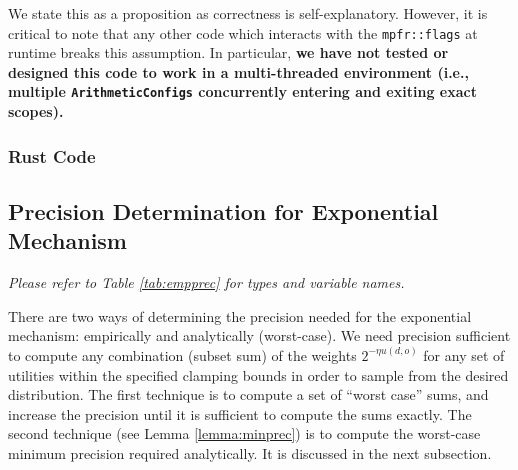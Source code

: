 \documentclass[11pt]{article}
\theoremstyle{definition}
\begin{document}
We state this as a proposition as correctness is self-explanatory. However, it is critical to note that any other code which interacts with the {\tt mpfr::flags} at runtime breaks this assumption. In particular, \textbf{we have not tested or designed this code to work in a multi-threaded environment (i.e., multiple {\tt ArithmeticConfigs} concurrently entering and exiting exact scopes).}

\subsubsection{Rust Code}

% 


% 

\subsection{Precision Determination for Exponential Mechanism}
\textit{Please refer to Table \ref{tab:empprec} for types and variable names.}

There are two ways of determining the precision needed for the exponential mechanism: empirically and analytically (worst-case). We need precision sufficient to compute any combination (subset sum) of the weights $2^{-\eta u(d,o)}$ for any set of utilities within the specified clamping bounds in order to sample from the desired distribution. The first technique is to compute a set of ``worst case'' sums, and increase the precision until it is sufficient to compute the sums exactly. The second technique (see Lemma \ref{lemma:minprec}) is to compute the worst-case minimum precision required analytically. It is discussed in the next subsection. 
\end{document}
